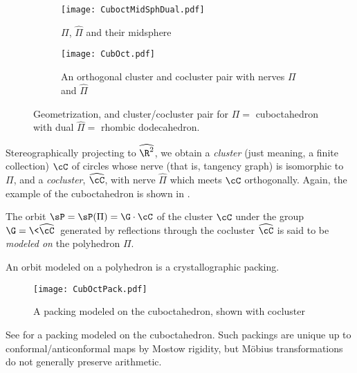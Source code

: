 \documentclass[12pt,reqno]{amsart}
\begin{document}
 \begin{figure}
        \begin{subfigure}[t]{0.25\textwidth}
                \centering
		\texttt{[image: CuboctMidSphDual.pdf]}
                \caption{$\Pi$, $\widehat\Pi$ and their midsphere}
                \label{fig:midSph}
        \end{subfigure}%
\qquad
        \begin{subfigure}[t]{0.65\textwidth}
                \centering
		\texttt{[image: CubOct.pdf]}
\caption{An orthogonal cluster and cocluster pair with nerves $\Pi$ and  $\hat\Pi$} %
\label{fig:geom}
        \end{subfigure}


\caption{Geometrization, and cluster/cocluster pair for $\Pi=$ cuboctahedron with dual $\widehat\Pi=$ rhombic dodecahedron.}
\label{fig:}
\end{figure}

Stereographically projecting to $\widehat{\R^2}$, we obtain a {\it cluster} (just meaning, a finite collection) $\cC$ of circles whose nerve (that is, tangency graph) is isomorphic to $\Pi$, and a {\it cocluster}, $\widehat\cC$, with nerve $\widehat\Pi$ which meets $\cC$ orthogonally. Again, the example of the cuboctahedron is shown in .


\begin{Def}
The orbit 
$\sP=\sP(\Pi)=\G\cdot\cC$ 
of the cluster $\cC$ under the group $\G=\<\widehat\cC\>$ generated by reflections through the cocluster $\widehat\cC$
 is
  said to be {\it modeled on} the polyhedron $\Pi$. 
\end{Def}

\begin{lem}
An orbit modeled on a polyhedron is %
a crystallographic %
packing. %
\end{lem}


\begin{figure}
\texttt{[image: CubOctPack.pdf]}
\caption{A packing modeled on the cuboctahedron, shown with cocluster}
\label{fig:cuboctPack}
\end{figure}

See  for a packing modeled on the cuboctahedron.
%
Such packings are unique up to conformal/anticonformal maps by Mostow rigidity, but M\"obius transformations do not generally preserve arithmetic.
\end{document}
